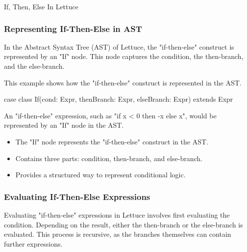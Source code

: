 \begin{notes}{If, Then, Else In Lettuce}
\begin{highlight}
    \end{highlight}
    
    \subsubsection*{Representing If-Then-Else in AST}
    
    In the Abstract Syntax Tree (AST) of Lettuce, the "if-then-else" construct is represented by an "If" node. This node captures the condition, the then-branch, and the else-branch.
    
    \begin{highlight}
    
        This example shows how the "if-then-else" construct is represented in the AST.
    
    \begin{code}[Scala]
    case class If(cond: Expr, thenBranch: Expr, elseBranch: Expr) extends Expr
    \end{code}
    
        An "if-then-else" expression, such as "if x < 0 then -x else x", would be represented by an "If" node in the AST.
        
        \begin{itemize}
            \item The "If" node represents the "if-then-else" construct in the AST.
            \item Contains three parts: condition, then-branch, and else-branch.
            \item Provides a structured way to represent conditional logic.
        \end{itemize}
    
    \end{highlight}
    
    \subsubsection*{Evaluating If-Then-Else Expressions}
    
    Evaluating "if-then-else" expressions in Lettuce involves first evaluating the condition. Depending on the result, either the then-branch or the else-branch is evaluated. This process is recursive, 
    as the branches themselves can contain further expressions.
    
    \begin{highlight}
    

\end{highlight}
\end{notes}
